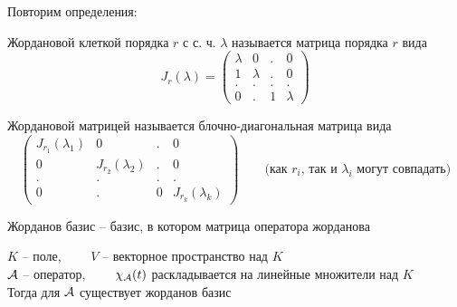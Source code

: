 Повторим определения:

\begin{definition}
	Жордановой клеткой порядка $ r $ с с. ч. $ \lambda $ называется матрица порядка $ r $ вида
	$$ J_r(\lambda) =
	\begin{pmatrix}
		\lambda & 0 & . & 0 \\
		1 & \lambda & . & 0 \\
		. & . & . & . \\
		0 & . & 1 & \lambda
	\end{pmatrix} $$
\end{definition}

\begin{definition}
	Жордановой матрицей называется блочно-диагональная матрица вида
	$$
	\begin{pmatrix}
		J_{r_1}(\lambda_1) & 0 & . & 0 \\
		0 & J_{r_2}(\lambda_2) & . & 0 \\
		. & . & . & . \\
		0 & . & 0 & J_{r_k}(\lambda_k)
	\end{pmatrix} \qquad \text{(как } r_i \text{, так и } \lambda_i \text{ могут совпадать)} $$
\end{definition}

\begin{definition}
	Жорданов базис -- базис, в котором матрица оператора жорданова
\end{definition}

\begin{theorem}
	$ K $ -- поле, $ \qquad V $ -- векторное пространство над $ K $ \\
	$ \mathcal{A} $ -- оператор, $ \qquad \chi_{\mathcal{A}}(t) $ раскладывается на линейные множители над $ K $ \\
	Тогда для $ \mathcal{A} $ существует жорданов базис
\end{theorem}
